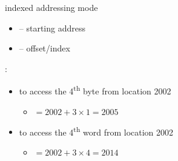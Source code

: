 \begin{frame}
  \begin{minipage}{.65\linewidth}
    \begin{block}{indexed addressing mode}
      \begin{center}
      \end{center}
      \begin{itemize}
      \item {\scriptsize{ -- starting address}}
      \item {\scriptsize{ -- offset/index}}
      \end{itemize}
    \end{block}
    \begin{block}{:}
      \begin{itemize}
      \item to access the 4\textsuperscript{th} byte from location 2002
        \begin{itemize}
        \item[]  $= 2002+3\times{}1 = 2005$
        \end{itemize}
      \item to access the 4\textsuperscript{th} word from location 2002
        \begin{itemize}
        \item[]  $= 2002+3\times{}4 = 2014$
        \end{itemize}
      \end{itemize}
    \end{block}
  \end{minipage}\hfill
  \begin{minipage}{.29\linewidth}
    \begin{center}
       
    \end{center}
  \end{minipage}
\end{frame}

